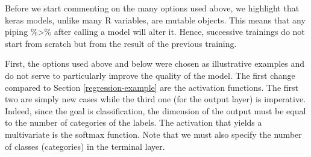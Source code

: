 \documentclass[]{krantz}
\makeatletter
\newenvironment{Shaded}{\begin{snugshade}}{\end{snugshade}}
\newcommand{\CommentTok}[1]{\textcolor[rgb]{0.37,0.37,0.37}{\textit{#1}}}
\newcommand{\DataTypeTok}[1]{\textcolor[rgb]{0.27,0.27,0.27}{#1}}
\newcommand{\DecValTok}[1]{\textcolor[rgb]{0.06,0.06,0.06}{#1}}
\newcommand{\FloatTok}[1]{\textcolor[rgb]{0.06,0.06,0.06}{#1}}
\newcommand{\KeywordTok}[1]{\textcolor[rgb]{0.27,0.27,0.27}{\textbf{#1}}}
\newcommand{\NormalTok}[1]{#1}
\newcommand{\OperatorTok}[1]{\textcolor[rgb]{0.43,0.43,0.43}{\textbf{#1}}}
\newcommand{\StringTok}[1]{\textcolor[rgb]{0.5,0.5,0.5}{#1}}
\newenvironment{kframe}{%
\medskip{}
\setlength{\fboxsep}{.8em}
 \def\at@end@of@kframe{}%
 \ifinner\ifhmode%
  \def\at@end@of@kframe{\end{minipage}}%
  \begin{minipage}{\columnwidth}%
 \fi\fi%
 \def\FrameCommand##1{\hskip\@totalleftmargin \hskip-\fboxsep
 \colorbox{shadecolor}{##1}\hskip-\fboxsep
     \hskip-\linewidth \hskip-\@totalleftmargin \hskip\columnwidth}%
 \MakeFramed {\advance\hsize-\width
   \@totalleftmargin\z@ \linewidth\hsize
   \@setminipage}}%
 {\par\unskip\endMakeFramed%
 \at@end@of@kframe}
\renewenvironment{Shaded}{\begin{kframe}}{\end{kframe}}
\theoremstyle{definition}
\theoremstyle{definition}
\theoremstyle{definition}
\theoremstyle{remark}
\makeatother
\begin{document}
\begin{Shaded}
\end{Shaded}

\normalsize

Before we start commenting on the many options used above, we highlight
that keras models, unlike many R variables, are mutable objects. This
means that any piping \%\textgreater{}\% after calling a model will
alter it. Hence, successive trainings do not start from scratch but from
the result of the previous training.

First, the options used above and below were chosen as illustrative
examples and do not serve to particularly improve the quality of the
model. The first change compared to Section \ref{regression-example} are
the activation functions. The first two are simply new cases while the
third one (for the output layer) is imperative. Indeed, since the goal
is classification, the dimension of the output must be equal to the
number of categories of the labels. The activation that yields a
multivariate is the softmax function. Note that we must also specify the
number of classes (categories) in the terminal layer.
\end{document}

